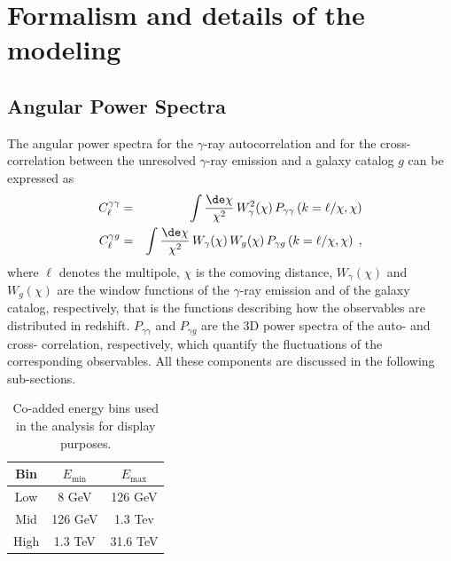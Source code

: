 \section{Formalism and details of the modeling}
\label{app:model}

\subsection{Angular Power Spectra}

The angular power spectra for the $\gamma$-ray autocorrelation and for the cross-correlation between the unresolved $\gamma$-ray emission and a galaxy catalog $g$ can be expressed as \cite{camera2013novel,camera2015tomographic,fornengo2014particle}
\begin{eqnarray}
    \label{eq:auto}
     C_\ell^{\gamma \gamma} &=& \int \frac{\de\chi}{\chi^2}\,W_{\gamma}^2(\chi)  
 \,P_{\gamma \gamma}\left(k=\ell/\chi,\chi\right) \\ 
     C_\ell^{\gamma g} &=&\int \frac{\de\chi}{\chi^2}\,W_{\gamma}(\chi)\, W_g(\chi)\,P_{\gamma g}\left(k=\ell/\chi,\chi\right) \; , \label{eq:cross}
 \end{eqnarray}
 where $\ell$ denotes the multipole, $\chi$ is the comoving distance, $W_{\gamma}(\chi)$ and $W_g(\chi)$ are the window functions of the $\gamma$-ray emission and of the galaxy catalog, respectively, that is the functions describing how the observables are distributed in redshift.  $P_{\gamma \gamma}$ and $P_{\gamma g}$ are the 3D power spectra of the auto- and cross- correlation, respectively, which quantify the fluctuations of the corresponding observables. All these components are discussed in the following sub-sections.


\begin{table}[t!]
\centering
\begin{tabular}{|c|cc|}
\hline
Bin & $E_\textrm{{min}}$ & $E_\textrm{{max}}$ \\
\hline
 Low & 8 GeV & 126 GeV \\  
 Mid & 126 GeV & 1.3 Tev \\
 High & 1.3 TeV & 31.6 TeV \\
\hline
  \end{tabular}
\caption{Co-added energy bins used in the analysis for display purposes.}
  \label{Tab:energybin}
\end{table}



